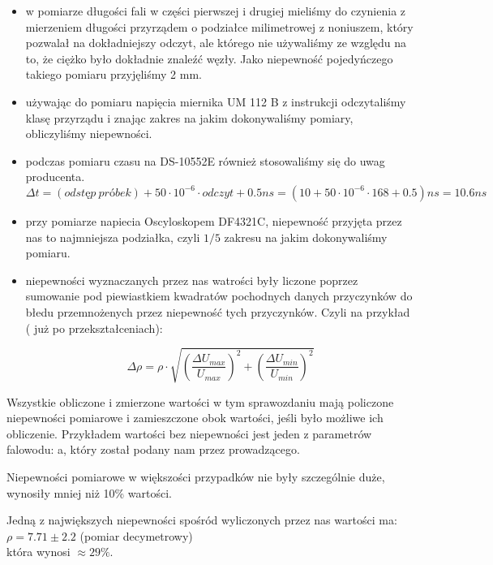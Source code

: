 \documentclass[a4paper,11pt]{article}
\begin{document}
\begin {itemize}
\item w pomiarze długości fali w części pierwszej i drugiej mieliśmy do czynienia z mierzeniem długości przyrządem o podziałce milimetrowej z noniuszem, który pozwalał na dokładniejszy odczyt, ale którego nie używaliśmy ze względu na to, że ciężko było dokładnie znaleźć węzły. Jako niepewność pojedyńczego takiego pomiaru przyjęliśmy 2 mm.

\item używając do pomiaru napięcia miernika UM 112 B z instrukcji odczytaliśmy klasę przyrządu i znając zakres na jakim dokonywaliśmy pomiary, obliczyliśmy niepewności. 

\item podczas pomiaru czasu na DS-10552E również stosowaliśmy się do uwag producenta.
$$ \Delta t = (odstęp \ próbek) + 50\cdot 10^{-6} \cdot  odczyt + 0.5 ns = (10+50\cdot 10^{-6}\cdot 168 +0.5)ns = 10.6ns  $$ 

\item przy pomiarze napiecia Oscyloskopem DF4321C, niepewność przyjęta przez nas to najmniejsza podziałka, czyli $1/5$ zakresu na jakim dokonywaliśmy pomiaru. 

\item niepewności wyznaczanych przez nas watrości były liczone poprzez sumowanie pod piewiastkiem kwadratów pochodnych danych przyczynków do błedu przemnożenych przez niepewność tych przyczynków. Czyli na przykład ( już po przekształceniach): 

$$ \Delta \rho =\rho \cdot \sqrt { \left( \frac {\Delta U_{max}} {U_{max}} \right)^2 + \left( \frac {\Delta U_{min}} {U_{min}} \right)^2 } $$
\end{itemize}


Wszystkie obliczone i zmierzone wartości w tym sprawozdaniu mają policzone niepewności pomiarowe i zamieszczone obok wartości, jeśli było możliwe ich obliczenie. Przykładem wartości bez niepewności jest jeden z parametrów falowodu: a, który został podany nam przez prowadzącego.

Niepewności pomiarowe w większości przypadków nie były szczególnie duże, wynosiły mniej niż 10\% wartości.

Jedną z największych niepewności spośród wyliczonych przez nas wartości ma:
\( \rho = 7.71 \pm 2.2 \) (pomiar decymetrowy) \\
która wynosi \( \approx 29 \% \).
\end{document}
